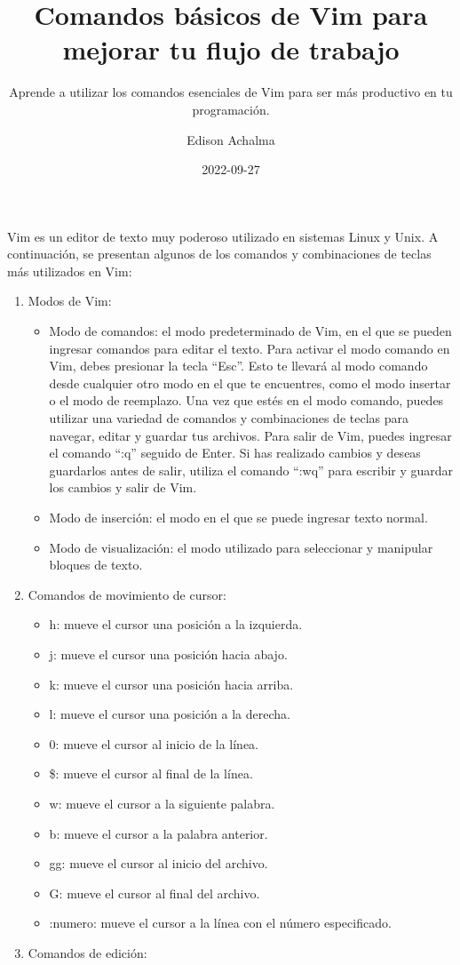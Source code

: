 \documentclass[
  a4paper,
]{article}
\title{Comandos básicos de Vim para mejorar tu flujo de trabajo}
\subtitle{Aprende a utilizar los comandos esenciales de Vim para ser más
productivo en tu programación.}
\author{Edison Achalma}
\date{2022-09-27}
\providecommand{\tightlist}{%
  \setlength{\itemsep}{0pt}\setlength{\parskip}{0pt}}\usepackage{longtable,booktabs,array}
\begin{document}
\maketitle

Vim es un editor de texto muy poderoso utilizado en sistemas Linux y
Unix. A continuación, se presentan algunos de los comandos y
combinaciones de teclas más utilizados en Vim:

\begin{enumerate}
\def\labelenumi{\arabic{enumi}.}
\item
  Modos de Vim:

  \begin{itemize}
  \item
    Modo de comandos: el modo predeterminado de Vim, en el que se pueden
    ingresar comandos para editar el texto. Para activar el modo comando
    en Vim, debes presionar la tecla ``Esc''. Esto te llevará al modo
    comando desde cualquier otro modo en el que te encuentres, como el
    modo insertar o el modo de reemplazo. Una vez que estés en el modo
    comando, puedes utilizar una variedad de comandos y combinaciones de
    teclas para navegar, editar y guardar tus archivos. Para salir de
    Vim, puedes ingresar el comando ``:q'' seguido de Enter. Si has
    realizado cambios y deseas guardarlos antes de salir, utiliza el
    comando ``:wq'' para escribir y guardar los cambios y salir de Vim.
  \item
    Modo de inserción: el modo en el que se puede ingresar texto normal.
  \item
    Modo de visualización: el modo utilizado para seleccionar y
    manipular bloques de texto.
  \end{itemize}
\item
  Comandos de movimiento de cursor:

  \begin{itemize}
  \tightlist
  \item
    h: mueve el cursor una posición a la izquierda.
  \item
    j: mueve el cursor una posición hacia abajo.
  \item
    k: mueve el cursor una posición hacia arriba.
  \item
    l: mueve el cursor una posición a la derecha.
  \item
    0: mueve el cursor al inicio de la línea.
  \item
    \$: mueve el cursor al final de la línea.
  \item
    w: mueve el cursor a la siguiente palabra.
  \item
    b: mueve el cursor a la palabra anterior.
  \item
    gg: mueve el cursor al inicio del archivo.
  \item
    G: mueve el cursor al final del archivo.
  \item
    :numero: mueve el cursor a la línea con el número especificado.
  \end{itemize}
\item
  Comandos de edición:


\end{enumerate}
\end{document}
